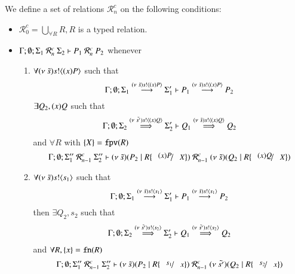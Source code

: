 \begin{definition}\rm
	We define a set of relations $\mathcal{R}^c_n$
	on the following conditions:
%
	\begin{itemize}
		\item	$\mathcal{R}^c_0 = \bigcup_{\forall R} R, R$ is a typed relation.
		\item	$\Gamma; \emptyset; \Sigma_1\ \mathcal{R}^c_n\ \Sigma_2 \proves P_1\ \mathcal{R}^c_n\ P_2$
			whenever
			\begin{enumerate}
				\item	$\forall (\nu\ \tilde{s}) s ! \langle (x)P \rangle$ such that
					\[
						\Gamma; \emptyset; \Sigma_1 \stackrel{(\nu\ \tilde{s}) s ! \langle (x)P \rangle}{\longrightarrow} \Sigma_1' \vdash P_1 \stackrel{(\nu\ \tilde{s}) s ! \langle (x)P \rangle}{\longrightarrow} P_2
					\]
					$\exists Q_2, (x)Q$ such that
					\[
						\Gamma; \emptyset; \Sigma_2 \stackrel{(\nu\ \tilde{s'}) s ! \langle (x)Q \rangle}{\Longrightarrow} \Sigma_2' \vdash Q_1 \stackrel{(\nu\ \tilde{s}) s ! \langle (x)Q \rangle}{\Longrightarrow} Q_2
					\]
					and $\forall R$ with $\{X\} = \mathtt{fpv}(R)$
					\[
						\Gamma; \emptyset; \Sigma_1''\ \mathcal{R}^c_{n-1}\ \Sigma_2'' \proves
						\newsp{\tilde{s}}{P_2 \Par R\subst{(x) P}{X}}\ \mathcal{R}^c_{n-1}\  \newsp{\tilde{s}}{Q_2 \Par R\subst{(x) Q}{X}}
					\]

				\item	$\forall (\nu\ \tilde{s}) s ! \langle s_1 \rangle$ such that
					\[
						\Gamma; \emptyset; \Sigma_1 \stackrel{(\nu\ \tilde{s}) s ! \langle s_1 \rangle}{\longrightarrow} \Sigma_1' \vdash P_1 \stackrel{(\nu\ \tilde{s}) s ! \langle s_1 \rangle}{\longrightarrow} P_2
					\]
					then $\exists Q_2, s_2$ such that
					\[
						\Gamma; \emptyset; \Sigma_2 \stackrel{(\nu\ \tilde{s'}) s ! \langle s_2 \rangle}{\Longrightarrow} \Sigma_2' \vdash Q_1 \stackrel{(\nu\ \tilde{s'}) s ! \langle s_2 \rangle}{\Longrightarrow} Q_2
					\]
					and $\forall R, \{x\} = \mathtt{fn}(R)$
					\[
						\Gamma; \emptyset; \Sigma_1''\ \mathcal{R}^c_{n-1}\ \Sigma_2'' \proves \newsp{\tilde{s}}{P_2 \Par R\subst{s_1}{x}}\ \mathcal{R}^c_{n-1}\ 
						\newsp{\tilde{s'}}{Q_2 \Par R\subst{s_2}{x}}
					\]



\end{enumerate}
\end{itemize}
\end{definition}
